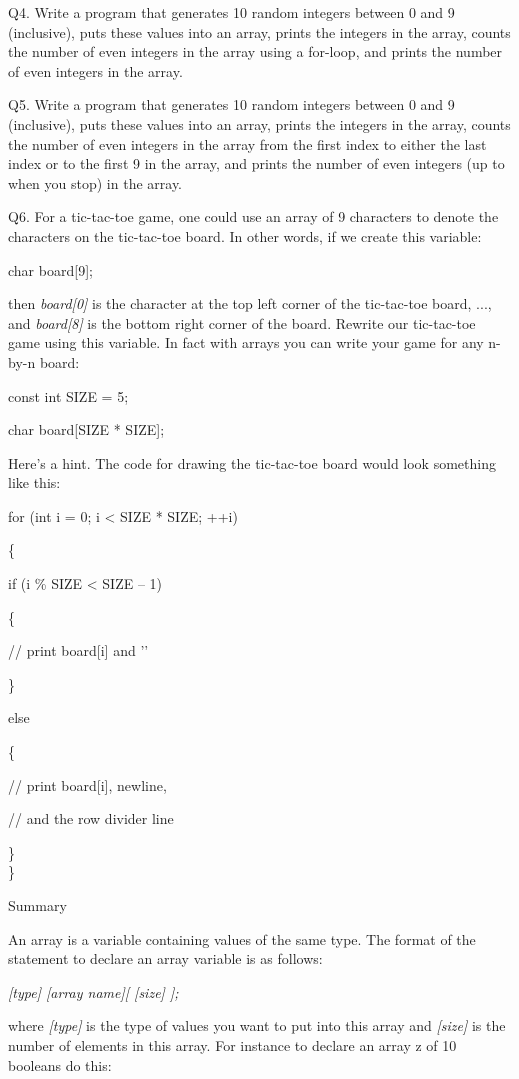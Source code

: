 \documentclass[
]{article}
\begin{document}
Q4. Write a program that generates 10 random integers between 0 and 9
(inclusive), puts these values into an array, prints the integers in the
array, counts the number of even integers in the array using a for-loop,
and prints the number of even integers in the array.

Q5. Write a program that generates 10 random integers between 0 and 9
(inclusive), puts these values into an array, prints the integers in the
array, counts the number of even integers in the array from the first
index to either the last index or to the first 9 in the array, and
prints the number of even integers (up to when you stop) in the array.

Q6. For a tic-tac-toe game, one could use an array of 9 characters to
denote the characters on the tic-tac-toe board. In other words, if we
create this variable:

char board{[}9{]};

then \emph{board{[}0{]}} is the character at the top left corner of the
tic-tac-toe board, ..., and \emph{board{[}8{]}} is the bottom right
corner of the board. Rewrite our tic-tac-toe game using this variable.
In fact with arrays you can write your game for any n-by-n board:

const int SIZE = 5;

char board{[}SIZE * SIZE{]};

Here's a hint. The code for drawing the tic-tac-toe board would look
something like this:

for (int i = 0; i \textless{} SIZE * SIZE; ++i)

\{

if (i \% SIZE \textless{} SIZE -- 1)

\{

// print board{[}i{]} and '\textbar'

\}

else

\{

// print board{[}i{]}, newline,

// and the row divider line

\}\\
\}

Summary

An array is a variable containing values of the same type. The format of
the statement to declare an array variable is as follows:

\emph{ {[}type{]} {[}array name{]}{[} {[}size{]} {]};}

where \emph{{[}type{]}} is the type of values you want to put into this
array and \emph{{[}size{]}} is the number of elements in this array. For
instance to declare an array z of 10 booleans do this:
\end{document}
